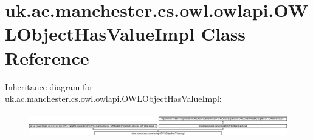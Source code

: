 \hypertarget{classuk_1_1ac_1_1manchester_1_1cs_1_1owl_1_1owlapi_1_1_o_w_l_object_has_value_impl}{\section{uk.\-ac.\-manchester.\-cs.\-owl.\-owlapi.\-O\-W\-L\-Object\-Has\-Value\-Impl Class Reference}
\label{classuk_1_1ac_1_1manchester_1_1cs_1_1owl_1_1owlapi_1_1_o_w_l_object_has_value_impl}
}
Inheritance diagram for uk.\-ac.\-manchester.\-cs.\-owl.\-owlapi.\-O\-W\-L\-Object\-Has\-Value\-Impl\-:\begin{figure}[H]
\begin{center}
\leavevmode
\includegraphics[height=1.078305cm]{classuk_1_1ac_1_1manchester_1_1cs_1_1owl_1_1owlapi_1_1_o_w_l_object_has_value_impl}
\end{center}
\end{figure}
